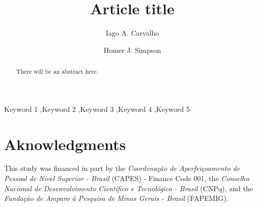 \documentclass[preprint,review,12pt]{elsarticle}
\begin{document}
\begin{frontmatter}

            
\title{Article title}


\author[label1]{Iago A. Carvalho}

\author[label2]{Homer J. Simpson}

\address[label1]{Department of Computer Science, Universidade Federal de Minas Gerais}


\address[label2]{Twenty Century Fox, USA}

\begin{abstract}
There will be an abstract here.
\end{abstract}

\begin{keyword}
Keyword 1 \sep Keyword 2 \sep Keyword 3 \sep Keyword 4 \sep Keyword 5
\end{keyword}

\end{frontmatter}





\section*{Aknowledgments}
This study was financed in part by the \emph{Coordenação de Aperfeiçoamento de Pessoal de Nível Superior - Brasil} (CAPES) - Finance Code 001, the \emph{Conselho Nacional de Desenvolvimento Científico e Tecnológico - Brasil} (CNPq), and the \emph{Fundação de Amparo à Pesquisa de Minas Gerais - Brasil} (FAPEMIG).


% 
% 
% 
% 
% 
% 
% 
% 
% 
% 
% 
% 


\end{document}
